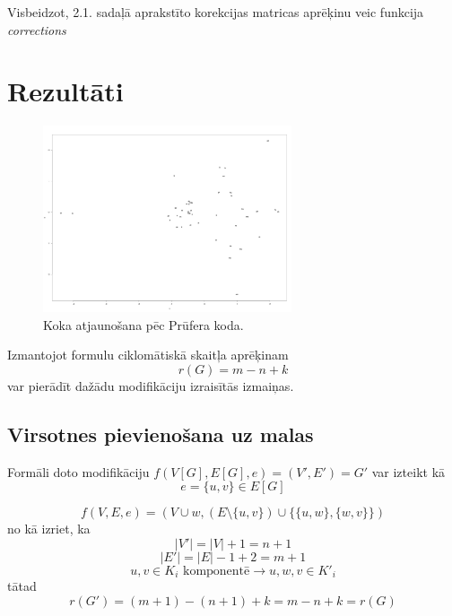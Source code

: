\documentclass[12pt, a4paper]{article}
\begin{document}
Visbeidzot, 2.1. sadaļā aprakstīto korekcijas matricas aprēķinu veic funkcija \textit{corrections}

\newpage
\section{Rezultāti}


\begin{figure}[h!]
    \centering
    \includegraphics[height=5.5cm,page=1]{distmap.png}
    \caption{Koka atjaunošana pēc Prūfera koda.}
\end{figure}


Izmantojot formulu ciklomātiskā skaitļa aprēķinam
\begin{equation}
    r(G) = m-n+k
\end{equation}
var pierādīt dažādu modifikāciju izraisītās izmaiņas.

\subsection{Virsotnes pievienošana uz malas}
Formāli doto modifikāciju $f(V[G], E[G], e)=(V',E')=G'$ var izteikt kā
\begin{equation}
    e= \lbrace u,v \rbrace \in E[G]
\end{equation}

\begin{equation}
    f(V,E,e) = (V \cup w, (E \setminus \lbrace u,v \rbrace) \cup \lbrace
    \lbrace u,w \rbrace, \lbrace w,v \rbrace 
    \rbrace)
\end{equation}
no kā izriet, ka
\begin{equation}
    \vert V' \vert = \vert V \vert + 1 = n + 1
\end{equation}
\begin{equation}
    \vert E' \vert = \vert E \vert -1 + 2 = m + 1
\end{equation}
\begin{equation}
    u,v \in K_i \text{ komponentē} \rightarrow u,w,v \in K'_i
\end{equation}
tātad
\begin{equation}
    r(G') = (m+1)-(n+1)+k = m-n+k = r(G)
\end{equation}
\end{document}
